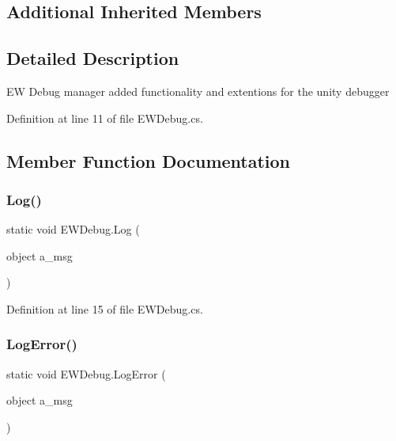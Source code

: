 \subsection*{Additional Inherited Members}


\subsection{Detailed Description}
EW Debug manager added functionality and extentions for the unity debugger 



Definition at line 11 of file E\+W\+Debug.\+cs.



\subsection{Member Function Documentation}
\mbox{\label{class_e_w_debug_a2e7779959df523149c9f9a45d44dcb42}} 
\subsubsection{\texorpdfstring{Log()}{Log()}}
{\footnotesize\ttfamily static void E\+W\+Debug.\+Log (\begin{DoxyParamCaption}\item[{object}]{a\+\_\+msg }\end{DoxyParamCaption})\hspace{0.3cm}{\ttfamily [static]}}



Definition at line 15 of file E\+W\+Debug.\+cs.

\mbox{\label{class_e_w_debug_abe53107ec02cd3b08cd5825a53d29183}} 
\subsubsection{\texorpdfstring{Log\+Error()}{LogError()}}
{\footnotesize\ttfamily static void E\+W\+Debug.\+Log\+Error (\begin{DoxyParamCaption}\item[{object}]{a\+\_\+msg }\end{DoxyParamCaption})\hspace{0.3cm}{\ttfamily [static]}}



